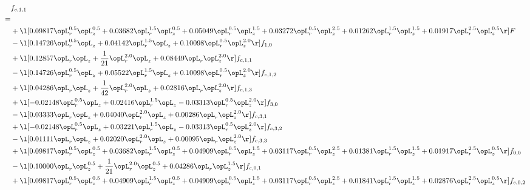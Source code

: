 \begin{alignat}{2} 
\label{eq:f_11_1} 
& f_{c,1,1} \nonumber \\ 
 = \\ 
& + \l[  0.09817 \opL_r^{0.5} \opL_z^{0.5} +  0.03682 \opL_r^{1.5} \opL_z^{0.5} +  0.05049 \opL_r^{0.5} \opL_z^{1.5} +  0.03272 \opL_r^{0.5} \opL_z^{2.5} +  0.01262 \opL_r^{1.5} \opL_z^{1.5} +  0.01917 \opL_r^{2.5} \opL_z^{0.5}  \r] F \nonumber \\ 
& - \l[  0.14726 \opL_r^{0.5} \opL_z +  0.04142 \opL_r^{1.5} \opL_z +  0.10098 \opL_r^{0.5} \opL_z^{2.0}  \r] f_{1,0} \nonumber \\ 
& + \l[  0.12857 \opL_r \opL_z + \frac{1}{21} \opL_r^{2.0} \opL_z +  0.08449 \opL_r \opL_z^{2.0}  \r] f_{c,1,1} \nonumber \\ 
& - \l[  0.14726 \opL_r^{0.5} \opL_z +  0.05522 \opL_r^{1.5} \opL_z +  0.10098 \opL_r^{0.5} \opL_z^{2.0}  \r] f_{c,1,2} \nonumber \\ 
& + \l[  0.04286 \opL_r \opL_z + \frac{1}{42} \opL_r^{2.0} \opL_z +  0.02816 \opL_r \opL_z^{2.0}  \r] f_{c,1,3} \nonumber \\ 
& + \l[  -0.02148 \opL_r^{0.5} \opL_z +  0.02416 \opL_r^{1.5} \opL_z   -0.03313 \opL_r^{0.5} \opL_z^{2.0}  \r] f_{3,0} \nonumber \\ 
& - \l[  0.03333 \opL_r \opL_z +  0.04040 \opL_r^{2.0} \opL_z +  0.00286 \opL_r \opL_z^{2.0}  \r] f_{c,3,1} \nonumber \\ 
& + \l[  -0.02148 \opL_r^{0.5} \opL_z +  0.03221 \opL_r^{1.5} \opL_z   -0.03313 \opL_r^{0.5} \opL_z^{2.0}  \r] f_{c,3,2} \nonumber \\ 
& - \l[  0.01111 \opL_r \opL_z +  0.02020 \opL_r^{2.0} \opL_z +  0.00095 \opL_r \opL_z^{2.0}  \r] f_{c,3,3} \nonumber \\ 
& + \l[  0.09817 \opL_r^{0.5} \opL_z^{0.5} +  0.03682 \opL_r^{1.5} \opL_z^{0.5} +  0.04909 \opL_r^{0.5} \opL_z^{1.5} +  0.03117 \opL_r^{0.5} \opL_z^{2.5} +  0.01381 \opL_r^{1.5} \opL_z^{1.5} +  0.01917 \opL_r^{2.5} \opL_z^{0.5}  \r] f_{0,0} \nonumber \\ 
& - \l[  0.10000 \opL_r \opL_z^{0.5} + \frac{1}{21} \opL_r^{2.0} \opL_z^{0.5} +  0.04286 \opL_r \opL_z^{1.5}  \r] f_{c,0,1} \nonumber \\ 
& + \l[  0.09817 \opL_r^{0.5} \opL_z^{0.5} +  0.04909 \opL_r^{1.5} \opL_z^{0.5} +  0.04909 \opL_r^{0.5} \opL_z^{1.5} +  0.03117 \opL_r^{0.5} \opL_z^{2.5} +  0.01841 \opL_r^{1.5} \opL_z^{1.5} +  0.02876 \opL_r^{2.5} \opL_z^{0.5}  \r] f_{c,0,2} \nonumber \\ 

\end{alignat}

